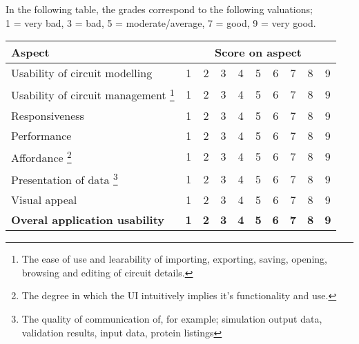 \documentclass{article}
\begin{document}
In the following table, the grades correspond to the following valuations;\\ 1 = very bad, 3 = bad, 5 = moderate/average, 7 = good, 9 = very good.
\begin{center}
\begin{tabularx}{\textwidth}{p{10cm} cc cc c cc cc} \toprule
\textbf{Aspect} & \multicolumn{9}{c}{\textbf{Score on aspect}} \\ \midrule
Usability of circuit modelling &1&2&3&4&5&6&7&8&9 \\ \midrule
Usability of circuit management \footnote{The ease of use and learability of importing, exporting, saving, opening, browsing and editing of circuit details.} &1&2&3&4&5&6&7&8&9 \\ \midrule
Responsiveness &1&2&3&4&5&6&7&8&9 \\ \midrule
Performance &1&2&3&4&5&6&7&8&9 \\ \midrule
Affordance \footnote{The degree in which the UI intuitively implies it's functionality and use.} &1&2&3&4&5&6&7&8&9 \\ \midrule
Presentation of data \footnote{The quality of communication of, for example; simulation output data, validation results, input data, protein listings} &1&2&3&4&5&6&7&8&9 \\ \midrule
Visual appeal &1&2&3&4&5&6&7&8&9 \\ \midrule
\textbf{Overal application usability} &\textbf{1}&\textbf{2}&\textbf{3}&\textbf{4}&\textbf{5}&\textbf{6}&\textbf{7}&\textbf{8}&\textbf{9} \\ \bottomrule
\end{tabularx}
\end{center}
\end{document}
